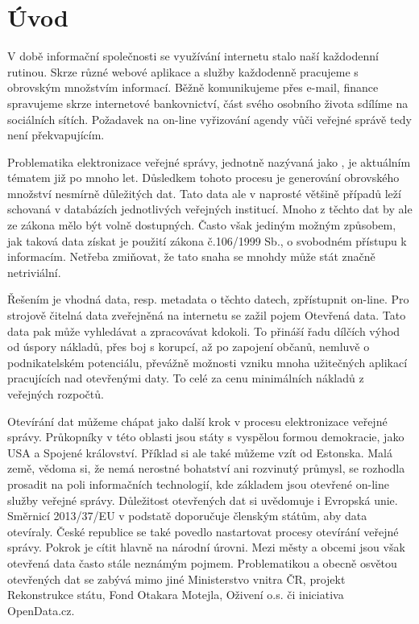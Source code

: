 \chapter{Úvod}

V době informační společnosti se využívání internetu stalo naší každodenní rutinou. Skrze různé webové aplikace a služby každodenně pracujeme s obrovským množstvím informací. Běžně komunikujeme přes e-mail, finance spravujeme skrze internetové bankovnictví, část svého osobního života sdílíme na sociálních sítích. Požadavek na on-line vyřizování agendy vůči veřejné správě tedy není překvapujícím.

Problematika elektronizace veřejné správy, jednotně nazývaná jako , je aktuálním tématem již po mnoho let. Důsledkem tohoto procesu je generování obrovského množství nesmírně důležitých dat. Tato data ale v naprosté většině případů leží schovaná v databázích jednotlivých veřejných institucí. Mnoho z těchto dat by ale ze zákona mělo být volně dostupných. Často však jediným možným způsobem, jak taková data získat je použití zákona č.106/1999 Sb.\cite{z106}, o svobodném přístupu k informacím. Netřeba zmiňovat, že tato snaha se mnohdy může stát značně netriviální.

Řešením je vhodná data, resp. metadata o těchto datech, zpřístupnit on-line. Pro strojově čitelná data zveřejněná na internetu se zažil pojem Otevřená data. Tato data pak může vyhledávat a zpracovávat kdokoli. To přináší řadu dílčích výhod od úspory nákladů, přes boj s korupcí, až po zapojení občanů, nemluvě o podnikatelském potenciálu, převážně možnosti vzniku mnoha užitečných aplikací pracujících nad otevřenými daty. To celé za cenu minimálních nákladů z veřejných rozpočtů.

Otevírání dat můžeme chápat jako další krok v procesu elektronizace veřejné správy. Průkopníky v této oblasti jsou státy s vyspělou formou demokracie, jako USA a Spojené království. Příklad si ale také můžeme vzít od Estonska. Malá země, vědoma si, že nemá nerostné bohatství ani rozvinutý průmysl, se rozhodla prosadit na poli informačních technologií, kde základem jsou otevřené on-line služby veřejné správy. Důležitost otevřených dat si uvědomuje i Evropská unie. Směrnicí 2013/37/EU\cite{smeu} v podstatě doporučuje členským státům, aby data otevíraly. 
České republice se také povedlo nastartovat procesy otevírání veřejné správy. Pokrok je cítit hlavně na národní úrovni. Mezi městy a obcemi jsou však otevřená data často stále neznámým pojmem. Problematikou a obecně osvětou otevřených dat se zabývá mimo jiné Ministerstvo vnitra ČR\cite{mv}, projekt Rekonstrukce státu\cite{rek}, Fond Otakara Motejla\cite{fom}, Oživení o.s.\cite{oz} či iniciativa OpenData.cz\cite{od}.

